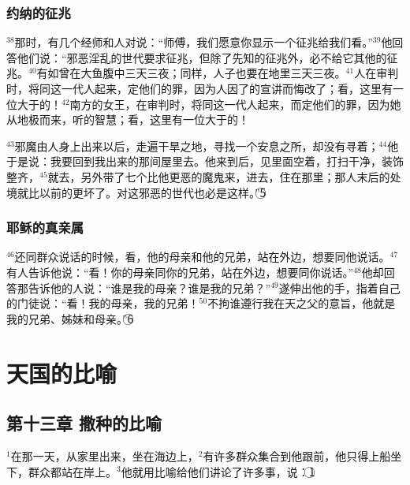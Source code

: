 \subsubsection{约纳的征兆}
$^{38}$那时，有几个经师和\UL[法利塞]人对\UL[耶稣]说：“师傅，我们愿意你显示一个征兆给我们看。”$^{39}$他回答他们说：“邪恶淫乱的世代要求征兆，但除了\UL[约纳]先知的征兆外，必不给它其他的征兆。$^{40}$有如\UL[约纳]曾在大鱼腹中三天三夜；同样，人子也要在地里三天三夜。$^{41}$\UL[尼尼微]人在审判时，将同这一代人起来，定他们的罪，因为\UL[尼尼微]人因了\UL[约纳]的宣讲而悔改了；看，这里有一位大于\UL[约纳]的！$^{42}$南方的女王，在审判时，将同这一代人起来，而定他们的罪，因为她从地极而来，听\UL[撒罗满]的智慧；看，这里有一位大于\UL[撒罗满]的！

$^{43}$邪魔由人身上出来以后，走遍干旱之地，寻找一个安息之所，却没有寻着；$^{44}$他于是说：我要回到我出来的那间屋里去。他来到后，见里面空着，打扫干净，装饰整齐，$^{45}$就去，另外带了七个比他更恶的魔鬼来，进去，住在那里；那人末后的处境就比以前的更坏了。对这邪恶的世代也必是这样。”\textcircled{5}


\subsubsection{耶稣的真亲属}
$^{46}$\UL[耶稣]还同群众说话的时候，看，他的母亲和他的兄弟，站在外边，想要同他说话。$^{47}$有人告诉他说：“看！你的母亲同你的兄弟，站在外边，想要同你说话。”$^{48}$他却回答那告诉他的人说：“谁是我的母亲？谁是我的兄弟？”$^{49}$遂伸出他的手，指着自己的门徒说：“看！我的母亲，我的兄弟！$^{50}$不拘谁遵行我在天之父的意旨，他就是我的兄弟、姊妹和母亲。”\textcircled{6}


\section{天国的比喻}


\subsection{第十三章 撒种的比喻}
$^{1}$在那一天，\UL[耶稣]从家里出来，坐在海边上，$^{2}$有许多群众集合到他跟前，他只得上船坐下，群众都站在岸上。$^{3}$他就用比喻给他们讲论了许多事，说：\textcircled{1}

